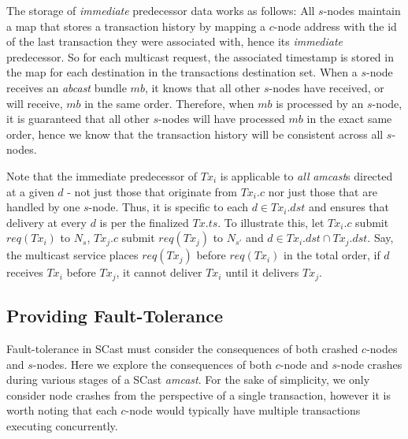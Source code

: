 \begin{description}
		The storage of \emph{immediate} predecessor data works as follows: All $s$-nodes maintain a map that stores a transaction history by mapping a $c$-node address with the id of the last transaction they were associated with, hence its \emph{immediate} predecessor.  So for each multicast request, the associated timestamp is stored in the map for each destination in the transactions destination set. When a $s$-node receives an \emph{abcast} bundle $mb$, it knows that all other $s$-nodes have received, or will receive, $mb$ in the same order.  Therefore, when $mb$ is processed by an $s$-node, it is guaranteed that all other $s$-nodes will have processed $mb$ in the exact same order, hence we know that the transaction history will be consistent across all $s$-nodes.  
		
		Note that the immediate predecessor of $Tx_i$ is applicable to \emph{all} \emph{amcast}s directed at a given $d$ - not just those that originate from $Tx_i.c$ nor just those that are handled by one $s$-node. Thus, it is specific to each $d \in Tx_i.dst$ and ensures that delivery at every $d$ is per the finalized $Tx.ts$.  To illustrate this, let $Tx_i.c$ submit $req(Tx_i)$ to $N_s$, $Tx_j.c$ submit $req(Tx_j)$ to $N_{s'}$ and $d \in Tx_i.dst \cap Tx_j.dst$. Say, the multicast service places $req(Tx_j)$ before $req(Tx_i)$ in the total order, if $d$ receives $Tx_i$ before $Tx_j$, it cannot deliver $Tx_i$ until it delivers $Tx_j$.
    \end{description}

	\subsection*{Providing Fault-Tolerance}\label{ssec:scast_fault_tolerance}
	Fault-tolerance in \textsf{SCast} must consider the consequences of both crashed $c$-nodes and $s$-nodes.  Here we explore the consequences of both $c$-node and $s$-node crashes during various stages of a \textsf{SCast} \emph{amcast}.  For the sake of simplicity, we only consider node crashes from the perspective of a single transaction, however it is worth noting that each $c$-node would typically have multiple transactions executing concurrently.  
	
